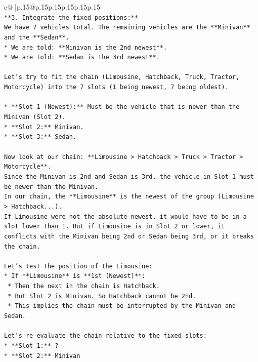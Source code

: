 \documentclass{article}
\begin{document}
{\begin{supertabular}{c@{$\;$}|p{.15\linewidth}@{}p{.15\linewidth}p{.15\linewidth}p{.15\linewidth}p{.15\linewidth}p{.15\linewidth}}
{{{\\ 
\texttt{**3. Integrate the fixed positions:**} \\
\texttt{We have 7 vehicles total. The remaining vehicles are the **Minivan** and the **Sedan**.} \\
\texttt{*   We are told: **Minivan is the 2nd newest**.} \\
\texttt{*   We are told: **Sedan is the 3rd newest**.} \\
\\ 
\texttt{Let's try to fit the chain (Limousine, Hatchback, Truck, Tractor, Motorcycle) into the 7 slots (1 being newest, 7 being oldest).} \\
\\ 
\texttt{*   **Slot 1 (Newest):** Must be the vehicle that is newer than the Minivan (Slot 2).} \\
\texttt{*   **Slot 2:** Minivan.} \\
\texttt{*   **Slot 3:** Sedan.} \\
\\ 
\texttt{Now look at our chain: **Limousine > Hatchback > Truck > Tractor > Motorcycle**.} \\
\texttt{Since the Minivan is 2nd and Sedan is 3rd, the vehicle in Slot 1 must be newer than the Minivan.} \\
\texttt{In our chain, the **Limousine** is the newest of the group (Limousine > Hatchback...).} \\
\texttt{If Limousine were not the absolute newest, it would have to be in a slot lower than 1. But if Limousine is in Slot 2 or lower, it conflicts with the Minivan being 2nd or Sedan being 3rd, or it breaks the chain.} \\
\\ 
\texttt{Let's test the position of the Limousine:} \\
\texttt{*   If **Limousine** is **1st (Newest)**:} \\
\texttt{    *   Then the next in the chain is Hatchback.} \\
\texttt{    *   But Slot 2 is Minivan. So Hatchback cannot be 2nd.} \\
\texttt{    *   This implies the chain must be interrupted by the Minivan and Sedan.} \\
\\ 
\texttt{Let's re{-}evaluate the chain relative to the fixed slots:} \\
\texttt{*   **Slot 1:** ?} \\
\texttt{*   **Slot 2:** Minivan} \\
}}}
\end{supertabular}}
\end{document}

